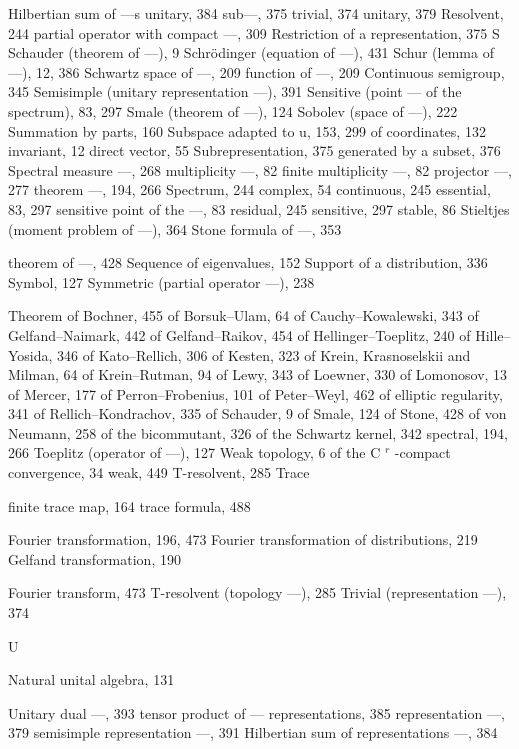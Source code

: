 Hilbertian sum of ---s unitary, 384 sub---, 375 trivial, 374 unitary, 379 Resolvent, 244 partial operator with compact ---, 309 Restriction of a representation, 375 S Schauder (theorem of ---), 9 Schrödinger (equation of ---), 431 Schur (lemma of ---), 12, 386 Schwartz space of ---, 209 function of ---, 209 Continuous semigroup, 345 Semisimple (unitary representation ---), 391 Sensitive (point --- of the spectrum), 83, 297 Smale (theorem of ---), 124 Sobolev (space of ---), 222 Summation by parts, 160 Subspace adapted to u, 153, 299 of coordinates, 132 invariant, 12 direct vector, 55 Subrepresentation, 375 generated by a subset, 376 Spectral measure ---, 268 multiplicity ---, 82 finite multiplicity ---, 82 projector ---, 277 theorem ---, 194, 266 Spectrum, 244 complex, 54 continuous, 245 essential, 83, 297 sensitive point of the ---, 83 residual, 245 sensitive, 297 stable, 86 Stieltjes (moment problem of ---), 364 Stone formula of ---, 353

theorem of ---, 428 Sequence of eigenvalues, 152 Support of a distribution, 336 Symbol, 127 Symmetric (partial operator ---), 238


Theorem of Bochner, 455 of Borsuk--Ulam, 64 of Cauchy--Kowalewski, 343 of Gelfand--Naimark, 442 of Gelfand--Raikov, 454 of Hellinger--Toeplitz, 240 of Hille--Yosida, 346 of Kato--Rellich, 306 of Kesten, 323 of Krein, Krasnoselskii and Milman, 64 of Krein--Rutman, 94 of Lewy, 343 of Loewner, 330 of Lomonosov, 13 of Mercer, 177 of Perron--Frobenius, 101 of Peter--Weyl, 462 of elliptic regularity, 341 of Rellich--Kondrachov, 335 of Schauder, 9 of Smale, 124 of Stone, 428 of von Neumann, 258 of the bicommutant, 326 of the Schwartz kernel, 342 spectral, 194, 266 Toeplitz (operator of ---), 127 Weak topology, 6 of the C \(^{r}\) -compact convergence, 34 weak, 449 T-resolvent, 285 Trace

finite trace map, 164 trace formula, 488

Fourier transformation, 196, 473 Fourier transformation of distributions, 219 Gelfand transformation, 190

Fourier transform, 473 T-resolvent (topology ---), 285 Trivial (representation ---), 374

U

Natural unital algebra, 131

Unitary dual ---, 393 tensor product of --- representations, 385 representation ---, 379 semisimple representation ---, 391 Hilbertian sum of representations ---, 384

